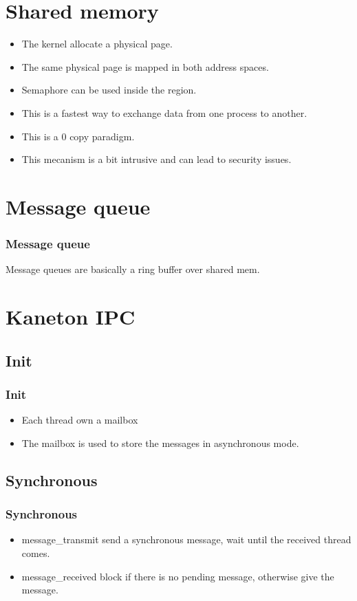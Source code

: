 \section{Shared memory}
\begin{frame}
\begin{itemize}
\item The kernel allocate a physical page.
\item The same physical page is mapped in both address spaces.
\item Semaphore can be used inside the region.
\item This is a fastest way to exchange data from one process to another.
\item This is a 0 copy paradigm.
\item This mecanism is a bit intrusive and can lead to security issues.
\end{itemize}
\end{frame}

\section{Message queue}
\begin{frame}
\frametitle{Message queue}
Message queues are basically a ring buffer over shared mem.
\end{frame}


\section{Kaneton IPC}
\subsection{Init}
\begin{frame}
\frametitle{Init}
\begin{itemize}
\item Each thread own a mailbox
\item The mailbox is used to store the messages in asynchronous mode.
\end{itemize}
\end{frame}

\subsection{Synchronous}
\begin{frame}
\frametitle{Synchronous}
\begin{itemize}
\item message\_transmit send a synchronous message, wait until the
received thread comes.
\item message\_received block if there is no pending message, otherwise
give the message.
\end{itemize}
\end{frame}

